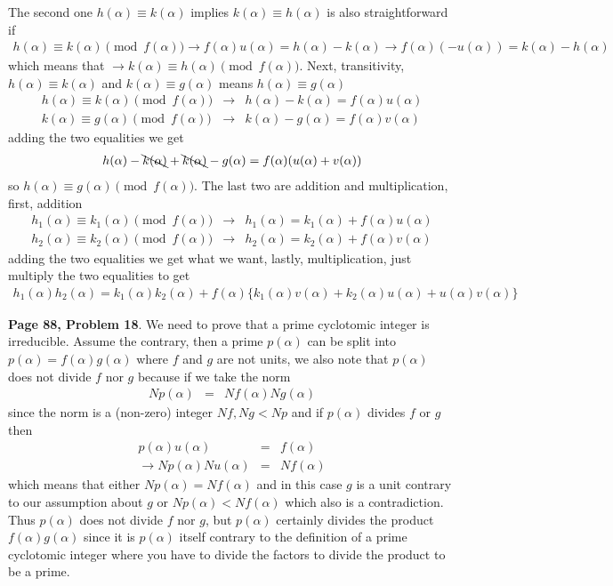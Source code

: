\documentclass[aps,preprint,preprintnumbers,nofootinbib,showpacs,prd]{revtex4-1}
\newcommand{\nbea}{\begin{eqnarray*}}
\newcommand{\neea}{\end{eqnarray*}}
\begin{document}
The second one $h(\alpha) \equiv k(\alpha)$ implies $k(\alpha) \equiv h(\alpha)$ is also straightforward if
%
\nbea
h(\alpha) \equiv k(\alpha) \pmod{f(\alpha)} \to f(\alpha)u(\alpha) = h(\alpha) - k(\alpha) \to f(\alpha)(-u(\alpha)) = k(\alpha) - h(\alpha) 
\neea
%
which means that $\to k(\alpha) \equiv h(\alpha) \pmod{f(\alpha)}$. Next, transitivity, $h(\alpha) \equiv k(\alpha)$ and $k(\alpha) \equiv g(\alpha)$ means $h(\alpha) \equiv g(\alpha)$
%
\nbea
h(\alpha) \equiv k(\alpha) \pmod{f(\alpha)} & \to & h(\alpha) - k(\alpha) = f(\alpha) u(\alpha) \\
k(\alpha) \equiv g(\alpha) \pmod{f(\alpha)} & \to & k(\alpha) - g(\alpha) = f(\alpha) v(\alpha)
\neea
%
adding the two equalities we get
%
\nbea
h(\alpha) - \bcancel{k(\alpha)} + \bcancel{k(\alpha)} - g(\alpha) = f(\alpha) (u(\alpha)+v(\alpha))
\neea
%
so $h(\alpha) \equiv g(\alpha) \pmod{f(\alpha)}$. The last two are addition and multiplication, first, addition
%
\nbea
h_1(\alpha) \equiv k_1(\alpha) \pmod{f(\alpha)} & \to & h_1(\alpha) = k_1(\alpha) + f(\alpha) u(\alpha) \\
h_2(\alpha) \equiv k_2(\alpha) \pmod{f(\alpha)} & \to & h_2(\alpha) = k_2(\alpha) + f(\alpha) v(\alpha)
\neea
%
adding the two equalities we get what we want, lastly, multiplication, just multiply the two equalities to get
%
\nbea
h_1(\alpha) h_2(\alpha) = k_1(\alpha)k_2(\alpha) + f(\alpha) \{ k_1(\alpha) v(\alpha) + k_2(\alpha) u(\alpha) + u(\alpha) v(\alpha)\}
\neea
%

{\bf Page 88, Problem 18}. We need to prove that a prime cyclotomic integer is irreducible. Assume the contrary, then a prime $p(\alpha)$ can be split into $p(\alpha) = f(\alpha)g(\alpha)$ where $f$ and $g$ are not units, we also note that $p(\alpha)$ does not divide $f$ nor $g$ because if we take the norm
%
\nbea
Np(\alpha) & = & Nf(\alpha) Ng(\alpha)
\neea
%
since the norm is a (non-zero) integer $Nf, Ng < Np$ and if $p(\alpha)$ divides $f$ or $g$ then
%
\nbea
p(\alpha) u(\alpha) & = & f(\alpha) \\
\to Np(\alpha) Nu(\alpha) & = & Nf(\alpha)
\neea
%
which means that either $Np(\alpha) = Nf(\alpha)$ and in this case $g$ is a unit contrary to our assumption about $g$ or $Np(\alpha) < Nf(\alpha)$ which also is a contradiction. Thus $p(\alpha)$ does not divide $f$ nor $g$, but $p(\alpha)$ certainly divides the product $f(\alpha)g(\alpha)$ since it is $p(\alpha)$ itself contrary to the definition of a prime cyclotomic integer where you have to divide the factors to divide the product to be a prime.
\end{document}
